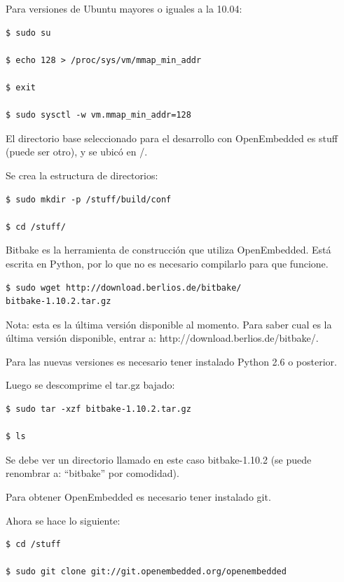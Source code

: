Para versiones de Ubuntu mayores o iguales a la 10.04:

\begin{verbatim}
$ sudo su

$ echo 128 > /proc/sys/vm/mmap_min_addr

$ exit

$ sudo sysctl -w vm.mmap_min_addr=128
\end{verbatim}


\bigskip
El directorio base seleccionado para el desarrollo con OpenEmbedded es stuff (puede ser otro), y se ubicó en /.

\newpage
Se crea la estructura de directorios:

\begin{verbatim}
$ sudo mkdir -p /stuff/build/conf

$ cd /stuff/
\end{verbatim}

Bitbake es la herramienta de construcción que utiliza OpenEmbedded. Está escrita en Python, por lo que no es necesario compilarlo para que funcione.

\begin{verbatim}
$ sudo wget http://download.berlios.de/bitbake/
bitbake-1.10.2.tar.gz
\end{verbatim}

Nota: esta es la última versión disponible al momento. Para saber cual es la última versión disponible, entrar a: http://download.berlios.de/bitbake/.

Para las nuevas versiones es necesario tener instalado Python 2.6 o posterior.

\bigskip
Luego se descomprime el tar.gz bajado:

\begin{verbatim}
$ sudo tar -xzf bitbake-1.10.2.tar.gz

$ ls
\end{verbatim}

Se debe ver un directorio llamado en este caso bitbake-1.10.2 (se puede renombrar a: “bitbake” por comodidad).

\bigskip
Para obtener OpenEmbedded es necesario tener instalado git.

\bigskip
Ahora se hace lo siguiente:

\begin{verbatim}
$ cd /stuff

$ sudo git clone git://git.openembedded.org/openembedded
\end{verbatim}

